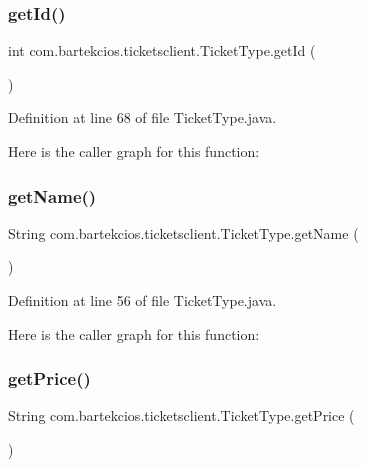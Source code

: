 \subsubsection{\texorpdfstring{get\+Id()}{getId()}}
{\footnotesize\ttfamily int com.\+bartekcios.\+ticketsclient.\+Ticket\+Type.\+get\+Id (\begin{DoxyParamCaption}{ }\end{DoxyParamCaption})}



Definition at line 68 of file Ticket\+Type.\+java.

Here is the caller graph for this function\+:
\mbox{\label{classcom_1_1bartekcios_1_1ticketsclient_1_1_ticket_type_abee6730aaaab5cf5484da77a1d3528e6}} 
\subsubsection{\texorpdfstring{get\+Name()}{getName()}}
{\footnotesize\ttfamily String com.\+bartekcios.\+ticketsclient.\+Ticket\+Type.\+get\+Name (\begin{DoxyParamCaption}{ }\end{DoxyParamCaption})}



Definition at line 56 of file Ticket\+Type.\+java.

Here is the caller graph for this function\+:
\mbox{\label{classcom_1_1bartekcios_1_1ticketsclient_1_1_ticket_type_a2fe11180a5868b251b88b0badb659aa6}} 
\subsubsection{\texorpdfstring{get\+Price()}{getPrice()}}
{\footnotesize\ttfamily String com.\+bartekcios.\+ticketsclient.\+Ticket\+Type.\+get\+Price (\begin{DoxyParamCaption}{ }\end{DoxyParamCaption})}



